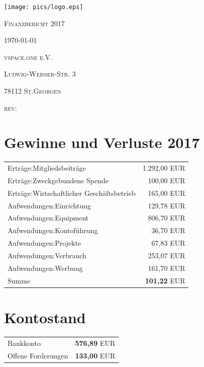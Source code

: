 \documentclass[12pt,a4paper]{article}
\begin{document}
\begin{titlepage}
	\centering
	\texttt{[image: pics/logo.eps]}\par\vspace{1cm}
  {\scshape\Huge Finanzbericht 2017 \par}
	\vfill

	{\scshape\large \today\par}
	{\scshape\large vspace.one e.V. \par}
	{\scshape\large Ludwig-Weißer-Str. 3 \par}
	{\scshape\large 78112 St.Georgen \par}
	{\scshape\large rev: \GITAbrHash \par}
	\vspace{1cm}
\end{titlepage}

\section{Gewinne und Verluste 2017}

\begin{tabular}{ l|r }
  Erträge:Mitgliedsbeiträge & 1.292,00 EUR \\
  Erträge:Zweckgebundene Spende & 100,00 EUR \\
  Erträge:Wirtschaftlicher Geschäftsbetrieb & 165,00 EUR \\
  \hline
  Aufwendungen:Einrichtung & 129,78 EUR \\
  Aufwendungen:Equipment & 806,70 EUR \\
  Aufwendungen:Kontoführung & 36,70 EUR \\
  Aufwendungen:Projekte & 67,83 EUR \\
  Aufwendungen:Verbrauch & 253,07 EUR \\
  Aufwendungen:Werbung & 161,70 EUR \\
  \hline
  Summe & \textbf{101,22} EUR \\

\end{tabular}

\section{Kontostand}
\begin{tabular}{ l|r }
Bankkonto & \textbf{576,89} EUR \\
Offene Forderungen & \textbf{133,00} EUR \\

\end{tabular}
\end{document}
